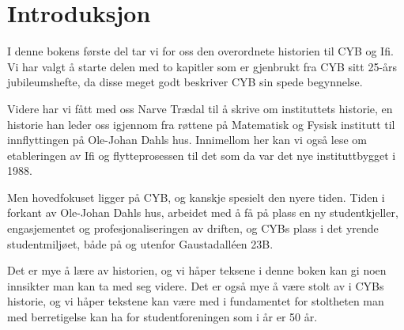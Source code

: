\chapter*{Introduksjon}

\setcounter{footnote}{0}

I denne bokens første del tar vi for oss den overordnete historien til CYB og Ifi. Vi har valgt å starte delen med to kapitler som er gjenbrukt fra CYB sitt 25-års jubileumshefte, da disse meget godt beskriver CYB sin spede begynnelse.

Videre har vi fått med oss Narve Trædal til å skrive om instituttets historie, en historie han leder oss igjennom fra røttene på Matematisk og Fysisk institutt til innflyttingen på Ole-Johan Dahls hus. Innimellom her kan vi også lese om etableringen av Ifi og flytteprosessen til det som da var det nye instituttbygget i 1988.

Men hovedfokuset ligger på CYB, og kanskje spesielt den nyere tiden. Tiden i forkant av Ole-Johan Dahls hus, arbeidet med å få på plass en ny studentkjeller, engasjementet og profesjonaliseringen av driften, og CYBs plass i det yrende studentmiljøet, både på og utenfor Gaustadalléen 23B.

Det er mye å lære av historien, og vi håper teksene i denne boken kan gi noen innsikter man kan ta med seg videre. Det er også mye å være stolt av i CYBs historie, og vi håper tekstene kan være med i fundamentet for stoltheten man med berretigelse kan ha for studentforeningen som i år er 50 år.